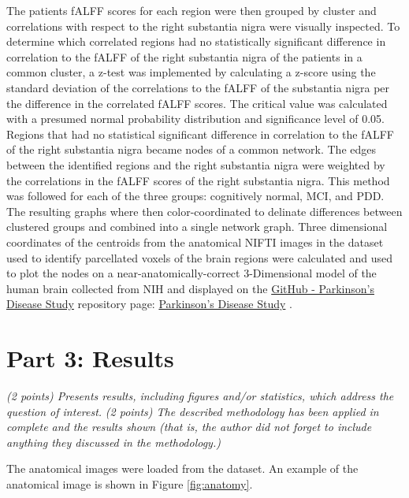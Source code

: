 \documentclass[12pt]{article}
\begin{document}
The patients fALFF scores for each region were then grouped by cluster and correlations with respect to the right substantia nigra were visually inspected. To determine which correlated regions had no statistically significant difference in correlation to the fALFF of the right substantia nigra of the patients in a common cluster, a z-test was implemented by calculating a z-score using the standard deviation of the correlations to the fALFF of the substantia nigra per the difference in the correlated fALFF scores. The critical value was calculated with a presumed normal probability distribution and significance level of 0.05. Regions that had no statistical significant difference in correlation to the fALFF of the right substantia nigra became nodes of a common network. The edges between the identified regions and the right substantia nigra were weighted by the correlations in the fALFF scores of the right substantia nigra. This method was followed for each of the three groups: cognitively normal, MCI, and PDD. The resulting graphs where then color-coordinated to delinate differences between clustered groups and combined into a single network graph. Three dimensional coordinates of the centroids from the anatomical NIFTI images in the dataset used to identify parcellated voxels of the brain regions were calculated and used to plot the nodes on a near-anatomically-correct 3-Dimensional model of the human brain collected from NIH \cite{NIH3DPX021161} and displayed on the \href{https://github.com/efwoods/Parkinson_Disease_Study}{GitHub - Parkinson's Disease Study} repository page: \href{https://efwoods.github.io/Parkinsons_Disease_Study/}{Parkinson's Disease Study} \cite{WoodsParkinsonsStudy}.

\section{Part 3: Results}
\textit{(2 points) Presents results, including figures and/or statistics, which address the question of interest.}
\textit{(2 points) The described methodology has been applied in complete and the results shown (that is, the author did not forget to include anything they discussed in the methodology.) }

The anatomical images were loaded from the dataset. An example of the anatomical image is shown in Figure \ref{fig:anatomy}.
\end{document}

